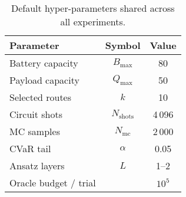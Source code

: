 \begin{table}[H]
\centering
\begin{tabular}{lcc}
\toprule
Parameter & Symbol & Value \\
\midrule
Battery capacity & $B_{\max}$ & 80 \\
Payload capacity & $Q_{\max}$ & 50 \\
Selected routes & $k$ & 10 \\
Circuit shots & $N_{\text{shots}}$ & 4\,096 \\
MC samples & $N_{\text{mc}}$ & 2\,000 \\
CVaR tail & $\alpha$ & 0.05 \\
Ansatz layers & $L$ & 1–2 \\
Oracle budget / trial &  & $10^{5}$ \\
\bottomrule
\end{tabular}
\caption{Default hyper-parameters shared across all experiments.}
\end{table}
